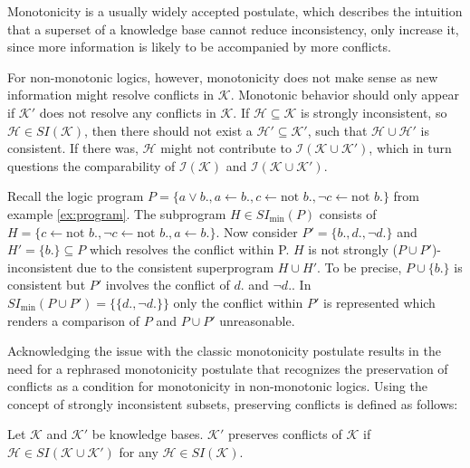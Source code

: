 Monotonicity is a usually widely accepted postulate, which describes the intuition that a superset of a knowledge base cannot reduce inconsistency, only increase it, since more information is likely to be accompanied by more conflicts.

For non-monotonic logics, however, monotonicity does not make sense as new information might resolve conflicts in \(\mathcal{K}\). Monotonic behavior should only appear if \(\mathcal{K}'\) does not resolve any conflicts in \(\mathcal{K}\). If \(\mathcal{H} \subseteq \mathcal{K}\) is strongly inconsistent, so \(\mathcal{H} \in SI(\mathcal{K})\), then there should not exist a \(\mathcal{H}' \subseteq \mathcal{K}'\), such that \(\mathcal{H} \cup \mathcal{H}'\) is consistent. If there was, \(\mathcal{H}\) might not contribute to \(\mathcal{I}(\mathcal{K} \cup \mathcal{K}')\), which in turn questions the comparability of \(\mathcal{I}(\mathcal{K})\) and \(\mathcal{I}(\mathcal{K} \cup \mathcal{K}')\).

\begin{example}
    Recall the logic program \(P = \{a \lor b., a \leftarrow b., c \leftarrow \text{not }b., \neg c \leftarrow \text{not }b.\}\) from example \ref{ex:program}. The subprogram \(H \in SI_{\min}(P)\) consists of \(H = \{c \leftarrow \text{not }b., \neg c \leftarrow \text{not }b., a \leftarrow b.\}\). Now consider \(P' = \{b., d., \neg d.\}\) and \(H' = \{b.\} \subseteq P\) which resolves the conflict within P. \(H\) is not strongly (\(P \cup P'\))-inconsistent due to the consistent superprogram \(H \cup H'\). To be precise, \(P \cup \{b.\}\) is consistent but \(P'\) involves the conflict of \(d.\) and \(\neg d.\). In \(SI_{\min}(P \cup P') = \{\{d., \neg d.\}\}\) only the conflict within \(P'\) is represented which renders a comparison of \(P\) and \(P \cup P'\) unreasonable.
\end{example}

Acknowledging the issue with the classic monotonicity postulate results in the need for a rephrased monotonicity postulate that recognizes the preservation of conflicts as a condition for monotonicity in non-monotonic logics. Using the concept of strongly inconsistent subsets, preserving conflicts is defined as follows:

\begin{definition}\label{def:monotonic}
    Let \(\mathcal{K}\) and \(\mathcal{K}'\) be knowledge bases. \(\mathcal{K}'\) preserves conflicts of \(\mathcal{K}\) if \(\mathcal{H} \in SI(\mathcal{K} \cup \mathcal{K}')\) for any \(\mathcal{H} \in SI(\mathcal{K})\).
\end{definition}

